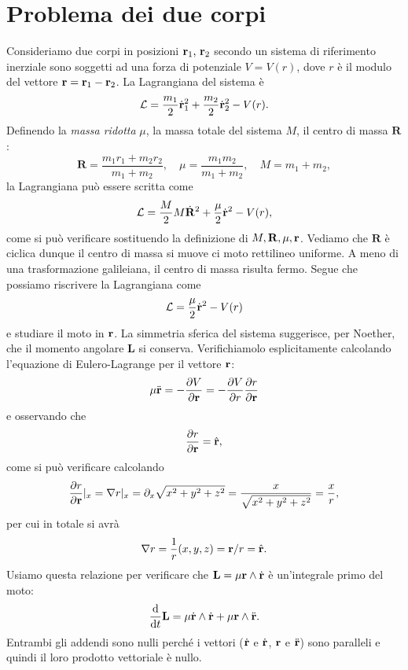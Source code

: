    \section{Problema dei due corpi}
    Consideriamo due corpi in posizioni $\mathbf{r}_1,\,\mathbf{r}_2$ secondo un sistema di riferimento inerziale sono soggetti ad una forza di potenziale $V=V(r)$, dove $r$ è il modulo del vettore $\mathbf{r}=\mathbf{r}_1-\mathbf{r}_2$. La Lagrangiana del sistema è
    \begin{equation}
        \mathcal{L} = \frac{m_1}{2}\dot{\mathbf{r}}^2_1+\frac{m_2}{2}\dot{\mathbf{r}}^2_2 -V(r).
    \end{equation}
    Definendo la \emph{massa ridotta} $\mu$, la massa totale del sistema $M$, il centro di massa $\mathbf{R}$:
    \begin{equation}
        \mathbf{R} = \frac{m_1r_1+m_2r_2}{m_1+m_2},\quad \mu = \frac{m_1m_2}{m_1+m_2}, \quad M = m_1+m_2,
    \end{equation}
    la Lagrangiana può essere scritta come
    \begin{equation}
        \mathcal{L} = \frac{M}{2}M\dot{\mathbf{R}}^2+\frac{\mu}{2}\dot{\mathbf{r}}^2-V(r),
    \end{equation}
    come si può verificare sostituendo la definizione di $M,\mathbf{R},\mu,\mathbf{r}$. Vediamo che $\mathbf{R}$ è ciclica dunque il centro di massa si muove ci moto rettilineo uniforme. A meno di una trasformazione galileiana, il centro di massa risulta fermo. Segue che possiamo riscrivere la Lagrangiana come
    \begin{equation}
        \mathcal{L} = \frac{\mu}{2}\dot{\mathbf{r}}^2-V(r)
    \end{equation}
    e studiare il moto in $\mathbf{r}$. La simmetria sferica del sistema suggerisce, per Noether, che il momento angolare $\mathbf{L}$ si conserva. Verifichiamolo esplicitamente calcolando l'equazione di Eulero-Lagrange per il vettore $\mathbf{r}$:
    \begin{equation}
        \mu\ddot{\mathbf{r}} = -\frac{\partial V}{\partial \mathbf{r}} = -\frac{\partial V}{\partial r}\frac{\partial r}{\partial \mathbf{r}}
    \end{equation}
    e osservando che
    \begin{equation}
        \frac{\partial r}{\partial \mathbf{r}} = \hat{\mathbf{r}},
    \end{equation}
    come si può verificare calcolando
    \begin{equation}
        \frac{\partial r}{\partial \mathbf{r}}|_x = \nabla r|_x = \partial_x \sqrt{x^2+y^2+z^2} = \frac{x}{\sqrt{x^2+y^2+z^2}} = \frac{x}{r},
    \end{equation}
    per cui in totale si avrà
    \begin{equation}
        \nabla r = \frac{1}{r}(x,y,z) = \mathbf{r}/r = \hat{\mathbf{r}}.
    \end{equation}
    Usiamo questa relazione per verificare che $\mathbf{L}=\mu\mathbf{r}\wedge \dot{\mathbf{r}}$ è un'integrale primo del moto:
    \begin{equation}
        \frac{\mathrm{d}}{\mathrm{d}t} \mathbf{L} = \mu\dot{\mathbf{r}}\wedge\dot{\mathbf{r}}+\mu\mathbf{r}\wedge\ddot{\mathbf{r}}.
    \end{equation}
    Entrambi gli addendi sono nulli perché i vettori ($\dot{\mathbf{r}}$ e $\dot{\mathbf{r}}$, $\mathbf{r}$ e $\ddot{\mathbf{r}}$) sono paralleli e quindi il loro prodotto vettoriale è nullo. 

